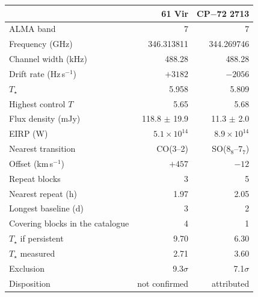 \begin{tabular}{@{}lrr@{}}
\hline
 & 61 Vir & CP$-$72 2713 \\
\hline
ALMA band & 7 & 7 \\
Frequency (GHz) & 346.313811 & 344.269746 \\
Channel width (kHz) & 488.28 & 488.28 \\
Drift rate (Hz\,s$^{-1}$) & $+3182$ & $-2056$ \\
$T_\star$ & 5.958 & 5.809 \\
Highest control $T$ & 5.65 & 5.68 \\
Flux density (mJy) & 118.8 $\pm$ 19.9 & 11.3 $\pm$ 2.0 \\
EIRP (W) & $5.1 \times 10^{14}$ & $8.9 \times 10^{14}$ \\
Nearest transition & CO(3--2) & SO($8_8$--$7_7$) \\
Offset (km\,s$^{-1}$) & $+457$ & $-12$ \\
Repeat blocks & 3 & 5 \\
Nearest repeat (h) & 1.97 & 2.05 \\
Longest baseline (d) & 3 & 2 \\
Covering blocks in the catalogue & 4 & 1 \\
$T_\star$ if persistent & 9.70 & 6.30 \\
$T_\star$ measured & 2.71 & 3.60 \\
Exclusion & 9.3$\sigma$ & 7.1$\sigma$ \\
Disposition & not confirmed & attributed \\
\hline
\end{tabular}
